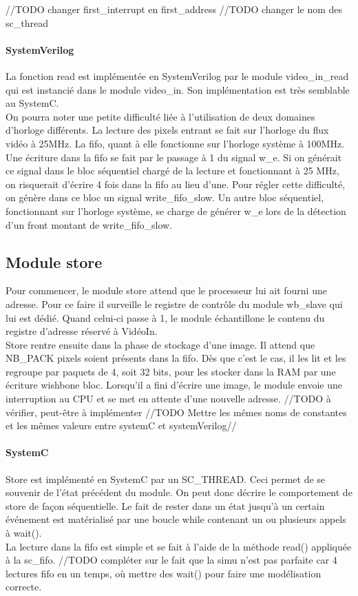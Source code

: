 \documentclass[a4paper,12pt]{report}
\begin{document}
//TODO changer first\_interrupt en first\_address
//TODO changer le nom des sc\_thread

\paragraph{SystemVerilog}
La fonction read est implémentée en SystemVerilog par le module video\_in\_read qui est instancié dans le module video\_in.
Son implémentation est très semblable au SystemC.\\
On pourra noter une petite difficulté liée à l'utilisation de deux domaines d'horloge différents.
La lecture des pixels entrant se fait sur l'horloge du flux vidéo à 25MHz. 
La fifo, quant à elle fonctionne sur l'horloge système à 100MHz. 
Une écriture dans la fifo se fait par le passage à 1 du signal w\_e. 
Si on générait ce signal dans le bloc séquentiel chargé de la lecture et fonctionnant à 25 MHz,
on risquerait d'écrire 4 fois dans la fifo au lieu d'une.
Pour régler cette difficulté, on génère dans ce bloc un signal write\_fifo\_slow. 
Un autre bloc séquentiel, fonctionnant sur l'horloge système, se charge de générer w\_e lors de la
détection d'un front montant de write\_fifo\_slow.


\subsection{Module store}
Pour commencer, le module store attend que le processeur lui ait fourni une adresse. Pour ce faire il surveille le registre de contrôle du module wb\_slave
qui lui est dédié. Quand celui-ci passe à 1, le module échantillone le contenu du registre d'adresse réservé à VidéoIn. \\
Store rentre ensuite dans la phase de stockage d'une image.
Il attend que NB\_PACK pixels soient présents dans la fifo. Dès que c'est le cas, il les lit et les regroupe par paquets de 4, soit 32 bits,
pour les stocker dans la RAM par une écriture wishbone bloc. 
Lorsqu'il a fini d'écrire une image, le module envoie une interruption au CPU et se met en attente d'une nouvelle adresse.
//TODO à vérifier, peut-être à implémenter
//TODO Mettre les mêmes noms de constantes et les mêmes valeurs entre systemC et systemVerilog//


\paragraph{SystemC}
Store est implémenté en SystemC par un SC\_THREAD.
Ceci permet de se souvenir de l'état précédent du module. 
On peut donc décrire le comportement de store de façon séquentielle.
Le fait de rester dans un état jusqu'à un certain événement est matérialisé par une boucle while contenant un ou plusieurs appels à wait(). \\
La lecture dans la fifo est simple et se fait à l'aide de la méthode read() appliquée à la sc\_fifo.
//TODO compléter sur le fait que la simu n'est pas parfaite car 4 lectures fifo en un temps, où mettre des wait() pour faire une modélisation correcte.
\end{document}
